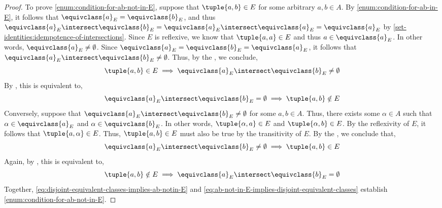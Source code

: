\begin{proof}
    \vspace{0.3cm}
    \noindent
    To prove \ref{enum:condition-for-ab-not-in-E}, suppose that \( \tuple{a,b} \in E \) for some
    arbitrary \( a,b \in A \). By \ref{enum:condition-for-ab-in-E}, it follows that \( \equivclass{a}_{E} = \equivclass{b}_{E} \),
    and thus \( \equivclass{a}_{E} \intersect \equivclass{b}_{E} = \equivclass{a}_{E} \intersect \equivclass{a}_{E} = \equivclass{a}_{E} \)
    by \cref{set-identities:idempotence-of-intersections}. Since \( E \) is reflexive, we know that \( \tuple{a,a} \in E \) and thus
    \( a \in \equivclass{a}_{E} \). In other words, \( \equivclass{a}_{E} \neq \emptyset \).
    Since \( \equivclass{a}_{E} = \equivclass{b}_{E} = \equivclass{a}_{E} \),
    it follows that \( \equivclass{a}_{E} \intersect \equivclass{b}_{E} \neq \emptyset \).
    Thus, by the , we conclude,
    \begin{equation*}
        \tuple{a,b} \in E \implies \equivclass{a}_{E} \intersect \equivclass{b}_{E} \neq \emptyset
    \end{equation*}
    By , this is equivalent to,
    \begin{equation}
        \label{eq:disjoint-equivalent-classes-implies-ab-notin-E}
        \equivclass{a}_{E} \intersect \equivclass{b}_{E} = \emptyset \implies \tuple{a,b} \notin E
    \end{equation}
    Conversely, suppose that \( \equivclass{a}_{E} \intersect \equivclass{b}_{E} \neq \emptyset \) for some \( a,b \in A \).
    Thus, there exists some \( \alpha \in A \) such that \( \alpha \in \equivclass{a}_{E} \) and \( \alpha \in \equivclass{b}_{E} \).
    In other words, \( \tuple{\alpha,a} \in E \) and \( \tuple{\alpha,b} \in E \). By the reflexivity of \( E \), it follows that
    \( \tuple{a, \alpha} \in E \). Thus, \( \tuple{a,b} \in E \) must also be true by the transitivity of \( E \).
    By the , we conclude that,
    \begin{equation*}
        \equivclass{a}_{E} \intersect \equivclass{b}_{E} \neq \emptyset \implies \tuple{a,b} \in E
    \end{equation*}
    Again, by , this is equivalent to,
    \begin{equation}
        \label{eq:ab-not-in-E-implies-disjoint-equivalent-classes}
        \tuple{a,b} \notin E \implies \equivclass{a}_{E} \intersect \equivclass{b}_{E} = \emptyset
    \end{equation}
    Together, \eqref{eq:disjoint-equivalent-classes-implies-ab-notin-E} and \eqref{eq:ab-not-in-E-implies-disjoint-equivalent-classes}
    establish \ref{enum:condition-for-ab-not-in-E}.
\end{proof}

